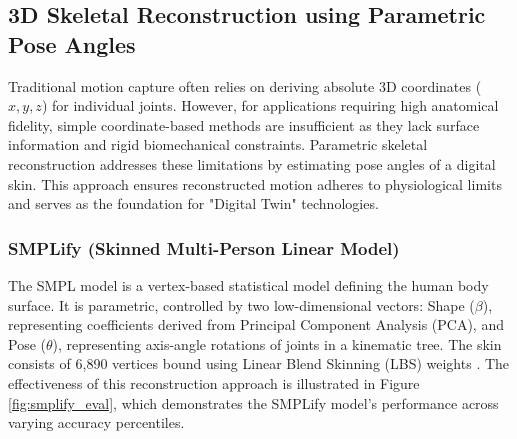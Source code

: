 \documentclass[12pt, a4paper, oneside]{report}
\begin{document}
\FloatBarrier

\subsection{3D Skeletal Reconstruction using Parametric Pose Angles}
Traditional motion capture often relies on deriving absolute 3D coordinates ($x, y, z$) for individual joints. However, for applications requiring high anatomical fidelity, simple coordinate-based methods are insufficient as they lack surface information and rigid biomechanical constraints. Parametric skeletal reconstruction addresses these limitations by estimating pose angles of a digital skin. This approach ensures reconstructed motion adheres to physiological limits and serves as the foundation for "Digital Twin" technologies.

\subsubsection*{SMPLify (Skinned Multi-Person Linear Model)}
The SMPL model is a vertex-based statistical model defining the human body surface. It is parametric, controlled by two low-dimensional vectors: Shape ($\beta$), representing coefficients derived from Principal Component Analysis (\ac{PCA}), and Pose ($\theta$), representing axis-angle rotations of joints in a kinematic tree. The skin consists of 6,890 vertices bound using Linear Blend Skinning (LBS) weights \cite{loper2015smpl}. The effectiveness of this reconstruction approach is illustrated in Figure \ref{fig:smplify_eval}, which demonstrates the SMPLify model's performance across varying accuracy percentiles. 
\end{document}
